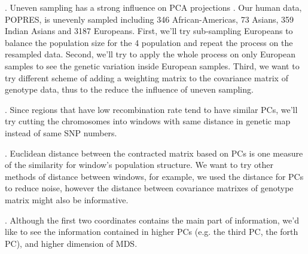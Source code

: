 \documentclass[11pt, oneside]{article}   	%
\begin{document}
. Uneven sampling has a strong influence on PCA projections \citep{mcvean2009genealogical}. 
Our human data, POPRES, is unevenly sampled including 346 African-Americas, 73 Asians, 359 Indian Asians and 3187 Europeans. 
First, we'll try sub-sampling Europeans to balance the population size for the 4 population and repeat the process on the resampled data. 
Second, we'll try to apply the whole process on only European samples to see the genetic variation inside European samples. 
Third, we want to try different scheme of adding a weighting matrix to the covariance matrix of genotype data, thus to the reduce the influence of uneven sampling.

. Since regions that have low recombination rate tend to have similar PCs, we'll try cutting the chromosomes into windows with same distance in genetic map instead of same SNP numbers.

. Euclidean distance between the contracted matrix based on PCs is one measure of the similarity for window's population structure.
We want to try other methods of distance between windows, for example, we used the distance for PCs to reduce noise, however the distance between covariance matrixes of genotype matrix might also be informative.

. Although the first two coordinates contains the main part of information, we'd like to see the information contained in higher PCs (e.g. the third PC, the forth PC), and higher dimension of MDS.


  
\end{document}
